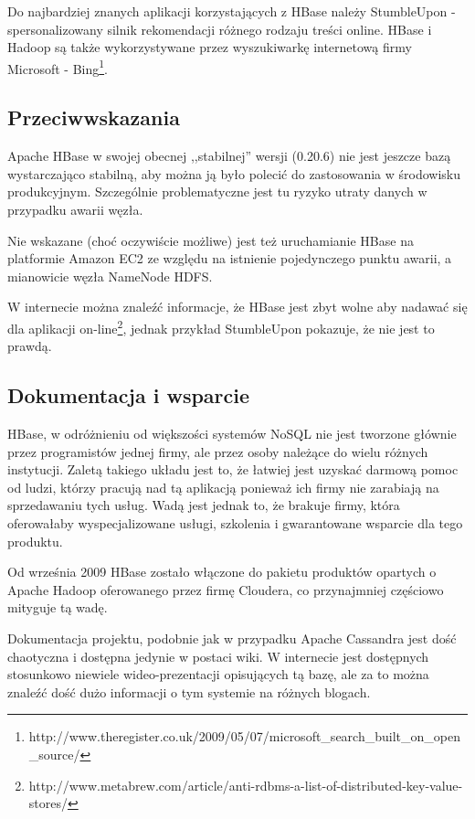 Do najbardziej znanych aplikacji korzystających z HBase należy StumbleUpon - spersonalizowany silnik rekomendacji różnego rodzaju treści online.
HBase i Hadoop są także wykorzystywane przez wyszukiwarkę internetową firmy Microsoft - Bing\footnote{http://www.theregister.co.uk/2009/05/07/microsoft\_search\_built\_on\_open\_source/}.

\subsection*{Przeciwwskazania}

Apache HBase w swojej obecnej ,,stabilnej'' wersji (0.20.6) nie jest jeszcze bazą wystarczająco stabilną, aby można ją było polecić do zastosowania w środowisku produkcyjnym.
Szczególnie problematyczne jest tu ryzyko utraty danych w przypadku awarii węzła.

Nie wskazane (choć oczywiście możliwe) jest też uruchamianie HBase na platformie Amazon EC2 ze względu na istnienie pojedynczego punktu awarii, a mianowicie węzła NameNode HDFS.

W internecie można znaleźć informacje, że HBase jest zbyt wolne aby nadawać się dla aplikacji on-line\footnote{http://www.metabrew.com/article/anti-rdbms-a-list-of-distributed-key-value-stores/}, jednak przykład StumbleUpon pokazuje, że nie jest to prawdą.

\subsection*{Dokumentacja i wsparcie}

HBase, w odróżnieniu od większości systemów NoSQL nie jest tworzone głównie przez programistów jednej firmy, ale przez osoby należące do wielu różnych instytucji.
Zaletą takiego układu jest to, że łatwiej jest uzyskać darmową pomoc od ludzi, którzy pracują nad tą aplikacją ponieważ ich firmy nie zarabiają na sprzedawaniu tych usług.
Wadą jest jednak to, że brakuje firmy, która oferowałaby wyspecjalizowane usługi, szkolenia i gwarantowane wsparcie dla tego produktu.

Od września 2009 HBase zostało włączone do pakietu produktów opartych o Apache Hadoop oferowanego przez firmę Cloudera, co przynajmniej częściowo mityguje tą wadę.

Dokumentacja projektu, podobnie jak w przypadku Apache Cassandra jest dość chaotyczna i dostępna jedynie w postaci wiki.
W internecie jest dostępnych stosunkowo niewiele wideo-prezentacji opisujących tą bazę, ale za to można znaleźć dość dużo informacji o tym systemie na różnych blogach.

